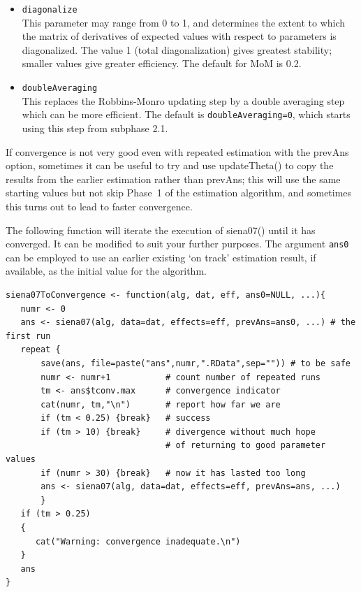 \documentclass[a4paper,fleqn,11pt]{article}
\newcommand{\+}{\, + \,}
\newcommand{\sfn}[1]{\textsf{#1}}
\begin{document}
\begin{itemize}
\item \texttt{diagonalize}\\
    This parameter may range from 0 to 1,
    and determines the extent to which the matrix of derivatives of expected
    values with respect to parameters is diagonalized.
    The value 1 (total diagonalization) gives greatest stability;
    smaller values give greater efficiency.
    The default for MoM is 0.2.
\item \texttt{doubleAveraging}\\
      This replaces the Robbins-Monro updating step by a double averaging
      step \citep{bather1989,SchwabeWalk96,KushnerYin03} which can be
      more efficient. The default is \texttt{doubleAveraging=0}, which starts using
      this step from subphase 2.1.
\end{itemize}


If convergence is not very good even with repeated estimation with
the \sfn{prevAns} option, sometimes it can be useful to try and use
\sfn{updateTheta()} to copy the results from the earlier estimation
rather than \sfn{prevAns}; this will use the same starting values
but not skip Phase~1 of the estimation algorithm, and sometimes
this turns out to lead to faster convergence.
\medskip

The following function will
iterate the execution of \sfn{siena07()} until it has converged.
It can be modified to suit your further purposes.
The argument \texttt{ans0} can be employed to use an earlier existing
`on track' estimation result, if available, as the initial value
for the algorithm.

\begin{verbatim}
siena07ToConvergence <- function(alg, dat, eff, ans0=NULL, ...){
   numr <- 0
   ans <- siena07(alg, data=dat, effects=eff, prevAns=ans0, ...) # the first run
   repeat {
       save(ans, file=paste("ans",numr,".RData",sep="")) # to be safe
       numr <- numr+1           # count number of repeated runs
       tm <- ans$tconv.max      # convergence indicator
       cat(numr, tm,"\n")       # report how far we are
       if (tm < 0.25) {break}   # success
       if (tm > 10) {break}     # divergence without much hope
                                # of returning to good parameter values
       if (numr > 30) {break}   # now it has lasted too long
       ans <- siena07(alg, data=dat, effects=eff, prevAns=ans, ...)
       }
   if (tm > 0.25)
   {
      cat("Warning: convergence inadequate.\n")
   }
   ans
}
\end{verbatim}
\end{document}
